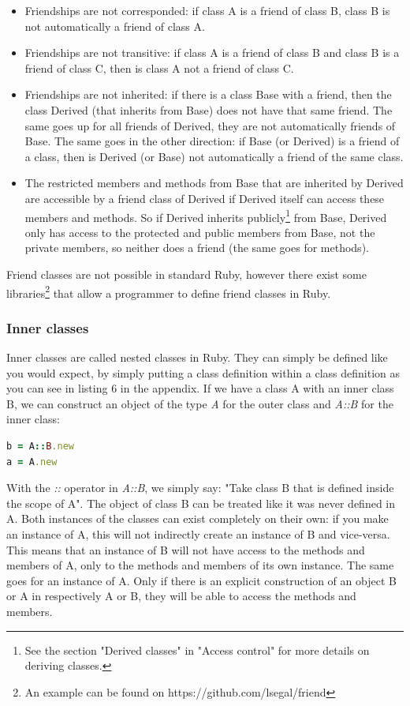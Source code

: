 \documentclass[10pt,a4paper,twocolumn]{article}
\begin{document}
\begin{itemize}
\item Friendships are not corresponded: if class A is a friend of class B, class B is not automatically a friend of class A.
\item Friendships are not transitive: if class A is a friend of class B and class B is a friend of class C, then is class A not a friend of class C.
\item Friendships are not inherited: if there is a class Base with a friend, then the class Derived (that inherits from Base) does not have that same friend. The same goes up for all friends of Derived, they are not automatically friends of Base. The same goes in the other direction: if Base (or Derived) is a friend of a class, then is Derived (or Base) not automatically a friend of the same class.
\item The restricted members and methods from Base that are inherited by Derived are accessible by a friend class of Derived if Derived itself can access these members and methods. So if Derived inherits publicly\footnote{See the section "Derived classes" in "Access control" for more details on deriving classes.} from Base, Derived only has access to the protected and public members from Base, not the private members, so neither does a friend (the same goes for methods).
\end{itemize}

Friend classes are not possible in standard Ruby, however there exist some libraries\footnote{An example can be found on https://github.com/lsegal/friend} that allow a programmer to define friend classes in Ruby.

\subsubsection{Inner classes}
Inner classes are called nested classes in Ruby. They can simply be defined like you would expect, by simply putting a class definition within a class definition as you can see in listing 6 in the appendix. If we have a class A with an inner class B, we can construct an object of the type \textit{A} for the outer class and \textit{A::B} for the inner class:

\begin{lstlisting}[language=Ruby]
b = A::B.new
a = A.new
\end{lstlisting}

With the \textit{::} operator in \textit{A::B}, we simply say: "Take class B that is defined inside the scope of A". The object of class B can be treated like it was never defined in A. Both instances of the classes can exist completely on their own: if you make an instance of A, this will not indirectly create an instance of B and vice-versa. This means that an instance of B will not have access to the methods and members of A, only to the methods and members of its own instance. The same goes for an instance of A. Only if there is an explicit construction of an object B or A in respectively A or B, they will be able to access the methods and members.
\end{document}
